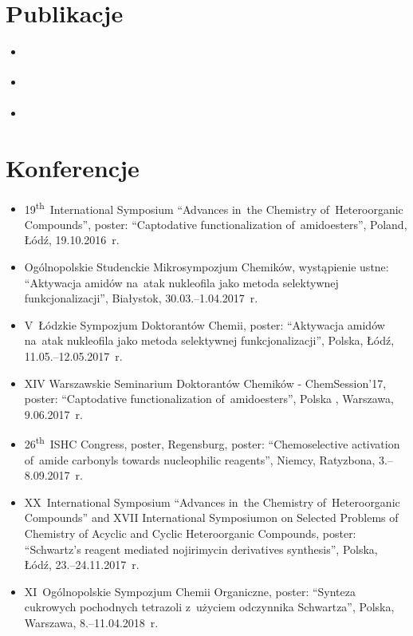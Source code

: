 \section{Publikacje}\label{intro:publications}
\begin{itemize}
  \item \cite{wieclaw21}
  \item \cite{stecko18}
  \item \cite{wieclaw22}
\end{itemize}

\section{Konferencje}\label{intro:conferences}
\begin{fullwidth}
\begin{itemize}
  \item 19\textsuperscript{th}~International Symposium \enquote{Advances in~the Chemistry of~Heteroorganic Compounds}, poster: \enquote{Captodative functionalization of~amidoesters}, Poland, Łódź, 19.10.2016~r.
  \item Ogólnopolskie Studenckie Mikrosympozjum Chemików, wystąpienie ustne: \enquote{Aktywacja amidów na~atak nukleofila jako metoda selektywnej funkcjonalizacji}, Białystok, 30.03.\-–1.04.2017~r.
  \item V~Łódzkie Sympozjum Doktorantów Chemii, poster: \enquote{Aktywacja amidów na~atak nukleofila jako metoda selektywnej funkcjonalizacji}, Polska, Łódź, 11.05.\-–12.05.2017~r.
  \item XIV Warszawskie Seminarium Doktorantów Chemików - ChemSession’17, poster: \enquote{Captodative functionalization of~amidoesters}, Polska , Warszawa, 9.06.2017~r.
  \item 26\textsuperscript{th}~ISHC Congress, poster, Regensburg, poster: \enquote{Chemoselective activation of~amide carbonyls towards nucleophilic reagents}, Niemcy, Ratyzbona, 3.\-–8.09.2017~r.
  \item XX~International Symposium \enquote{Advances in~the Chemistry of~Heteroorganic Compounds} and XVII International Symposiumon on Selected Problems of Chemistry of Acyclic and Cyclic Heteroorganic Compounds, poster: \enquote{Schwartz’s reagent mediated nojirimycin derivatives synthesis}, Polska, Łódź, 23.\-–24.11.2017~r.
  \item XI~Ogólnopolskie Sympozjum Chemii Organiczne, poster: \enquote{Synteza cukrowych pochodnych tetrazoli z~użyciem odczynnika Schwartza}, Polska, Warszawa, 8.\-–11.04.2018~r.

\end{itemize}
\end{fullwidth}
